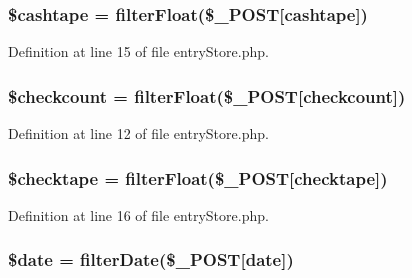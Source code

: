 \subsubsection[{\texorpdfstring{\$cashtape}{$cashtape}}]{\setlength{\rightskip}{0pt plus 5cm}\$cashtape = {\bf filter\+Float}(\$\+\_\+\+P\+O\+ST\mbox{[}\textquotesingle{}cashtape\textquotesingle{}\mbox{]})}\hypertarget{entry_store_8php_a27479da3e11521374d7ff42ea3ce7c4d}{}\label{entry_store_8php_a27479da3e11521374d7ff42ea3ce7c4d}


Definition at line 15 of file entry\+Store.\+php.

\subsubsection[{\texorpdfstring{\$checkcount}{$checkcount}}]{\setlength{\rightskip}{0pt plus 5cm}\$checkcount = {\bf filter\+Float}(\$\+\_\+\+P\+O\+ST\mbox{[}\textquotesingle{}checkcount\textquotesingle{}\mbox{]})}\hypertarget{entry_store_8php_aff7cc4d027f444fb1e9c4356364a641a}{}\label{entry_store_8php_aff7cc4d027f444fb1e9c4356364a641a}


Definition at line 12 of file entry\+Store.\+php.

\subsubsection[{\texorpdfstring{\$checktape}{$checktape}}]{\setlength{\rightskip}{0pt plus 5cm}\$checktape = {\bf filter\+Float}(\$\+\_\+\+P\+O\+ST\mbox{[}\textquotesingle{}checktape\textquotesingle{}\mbox{]})}\hypertarget{entry_store_8php_a21cc9b3edb79bb708eed7e39a8b9f0f3}{}\label{entry_store_8php_a21cc9b3edb79bb708eed7e39a8b9f0f3}


Definition at line 16 of file entry\+Store.\+php.

\subsubsection[{\texorpdfstring{\$date}{$date}}]{\setlength{\rightskip}{0pt plus 5cm}\$date = {\bf filter\+Date}(\$\+\_\+\+P\+O\+ST\mbox{[}\textquotesingle{}date\textquotesingle{}\mbox{]})}\hypertarget{entry_store_8php_a481c918f8d853749e00b5942cabf599a}{}\label{entry_store_8php_a481c918f8d853749e00b5942cabf599a}


